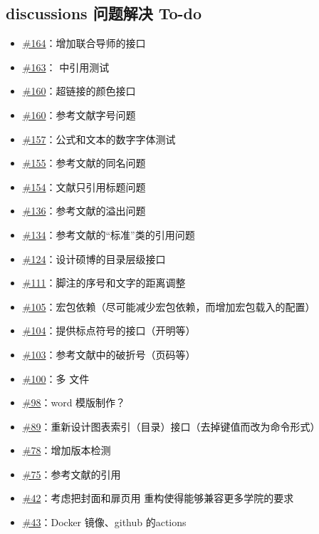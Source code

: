 \subsection{discussions 问题解决 To-do}

\begin{itemize}
  \item \href{https://github.com/whutug/whu-thesis/discussions/164}{\#164}：增加联合导师的接口
  \item \href{https://github.com/whutug/whu-thesis/discussions/163}{\#163}： 中引用测试
  \item \href{https://github.com/whutug/whu-thesis/discussions/160}{\#160}：超链接的颜色接口
  \item \href{https://github.com/whutug/whu-thesis/discussions/160}{\#160}：参考文献字号问题
  \item \href{https://github.com/whutug/whu-thesis/discussions/157}{\#157}：公式和文本的数字字体测试
  \item \href{https://github.com/whutug/whu-thesis/discussions/155}{\#155}：参考文献的同名问题
  \item \href{https://github.com/whutug/whu-thesis/discussions/154}{\#154}：文献只引用标题问题
  \item \href{https://github.com/whutug/whu-thesis/discussions/136}{\#136}：参考文献的溢出问题
  \item \href{https://github.com/whutug/whu-thesis/discussions/134}{\#134}：参考文献的“标准”类的引用问题
  \item \href{https://github.com/whutug/whu-thesis/discussions/124}{\#124}：设计硕博的目录层级接口
  \item \href{https://github.com/whutug/whu-thesis/discussions/111}{\#111}：脚注的序号和文字的距离调整
  \item \href{https://github.com/whutug/whu-thesis/discussions/105}{\#105}：宏包依赖（尽可能减少宏包依赖，而增加宏包载入的配置）
  \item \href{https://github.com/whutug/whu-thesis/discussions/104}{\#104}：提供标点符号的接口（开明等）
  \item \href{https://github.com/whutug/whu-thesis/discussions/103}{\#103}：参考文献中的破折号（页码等）
  \item \href{https://github.com/whutug/whu-thesis/discussions/100}{\#100}：多  文件
  \item \href{https://github.com/whutug/whu-thesis/discussions/98}{\#98}：word 模版制作？
  \item \href{https://github.com/whutug/whu-thesis/discussions/89}{\#89}：重新设计图表索引（目录）接口（去掉键值而改为命令形式）
  \item \href{https://github.com/whutug/whu-thesis/discussions/78}{\#78}：增加版本检测
  \item \href{https://github.com/whutug/whu-thesis/discussions/75}{\#75}：参考文献的引用
  \item \href{https://github.com/whutug/whu-thesis/discussions/42}{\#42}：考虑把封面和扉页用  重构使得能够兼容更多学院的要求
  \item \href{https://github.com/whutug/whu-thesis/discussions/43}{\#43}：Docker 镜像、github 的actions
\end{itemize}